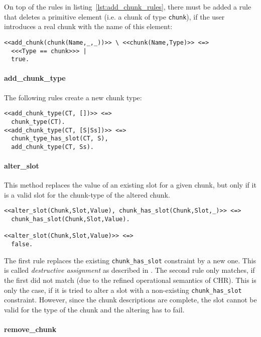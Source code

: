 On top of the rules in listing~\ref{lst:add_chunk_rules}, there must be added a rule that deletes a primitive element (i.e. a chunk of type \verb|chunk|), if the user introduces a real chunk with the name of this element:

\begin{lstlisting}[caption={Clean up primitive elements}]  
% delete chunk of Type chunk, if real chunk is added
<<add_chunk(chunk(Name,_,_))>> \ <<chunk(Name,Type)>> <=> 
  <<<Type == chunk>>> |
  true.
\end{lstlisting}


\paragraph{add\_chunk\_type}

The following rules create a new chunk type:

\begin{lstlisting}[caption={rules for \texttt{add\_chunk\_type}}]
<<add_chunk_type(CT, [])>> <=> 
  chunk_type(CT).
<<add_chunk_type(CT, [S|Ss])>> <=> 
  chunk_type_has_slot(CT, S), 
  add_chunk_type(CT, Ss).
\end{lstlisting}

\paragraph{alter\_slot}

This method replaces the value of an existing slot for a given chunk, but only if it is a valid slot for the chunk-type of the altered chunk.

\begin{lstlisting}
<<alter_slot(Chunk,Slot,Value), chunk_has_slot(Chunk,Slot,_)>> <=>
  chunk_has_slot(Chunk,Slot,Value).
  
<<alter_slot(Chunk,Slot,Value)>> <=>
  false.
\end{lstlisting}

The first rule replaces the existing \verb|chunk_has_slot| constraint by a new one. This is called \emph{destructive assignment} as described in \cite[32]{fru_chr_book_2009}. The second rule only matches, if the first did not match (due to the refined operational semantics of CHR). This is only the case, if it is tried to alter a slot with a non-existing \verb|chunk_has_slot| constraint. However, since the chunk descriptions are complete, the slot cannot be valid for the type of the chunk and the altering has to fail.

\paragraph{remove\_chunk}

